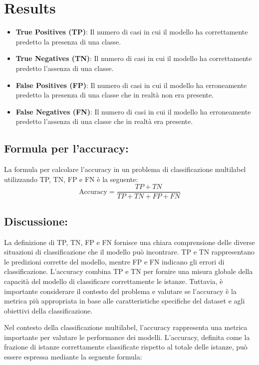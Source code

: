 \documentclass[../../Thesis.tex]{subfiles}
\begin{document}
\chapter{Results}
\label{chap:results}

\begin{itemize}
    \item \textbf{True Positives (TP)}: Il numero di casi in cui il modello ha correttamente predetto la presenza di una classe.
    \item \textbf{True Negatives (TN)}: Il numero di casi in cui il modello ha correttamente predetto l'assenza di una classe.
    \item \textbf{False Positives (FP)}: Il numero di casi in cui il modello ha erroneamente predetto la presenza di una classe che in realtà non era presente.
    \item \textbf{False Negatives (FN)}: Il numero di casi in cui il modello ha erroneamente predetto l'assenza di una classe che in realtà era presente.
\end{itemize}

\section*{Formula per l'accuracy:}
La formula per calcolare l'accuracy in un problema di classificazione multilabel utilizzando TP, TN, FP e FN è la seguente:
$$
\text{Accuracy} = \frac{TP + TN}{TP + TN + FP + FN}
$$

\section{Discussione:}
La definizione di TP, TN, FP e FN fornisce una chiara comprensione delle diverse situazioni di classificazione che il modello può incontrare. TP e TN rappresentano le predizioni corrette del modello, mentre FP e FN indicano gli errori di classificazione. L'accuracy combina TP e TN per fornire una misura globale della capacità del modello di classificare correttamente le istanze. Tuttavia, è importante considerare il contesto del problema e valutare se l'accuracy è la metrica più appropriata in base alle caratteristiche specifiche del dataset e agli obiettivi della classificazione.


Nel contesto della classificazione multilabel, l'accuracy rappresenta una metrica importante per valutare le performance dei modelli. L'accuracy, definita come la frazione di istanze correttamente classificate rispetto al totale delle istanze, può essere espressa mediante la seguente formula:
\end{document}
